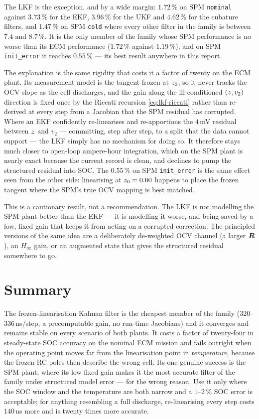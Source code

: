 The LKF is the exception, and by a wide margin: $1.72\,\%$ on SPM \texttt{nominal} against
$3.73\,\%$ for the EKF, $3.96\,\%$ for the UKF and $4.62\,\%$ for the cubature filters, and
$1.47\,\%$ on SPM \texttt{cold} where every other filter in the family is between $7.4$ and
$8.7\,\%$. It is the only member of the family whose SPM performance is no worse than its ECM
performance ($1.72\,\%$ against $1.19\,\%$), and on SPM \texttt{init\_error} it reaches
$0.55\,\%$ --- its best result anywhere in this report.

The explanation is the same rigidity that costs it a factor of twenty on the ECM plant. Its
measurement model is the tangent frozen at $z_0$, so it never tracks the OCV slope as the
cell discharges, and the gain along the ill-conditioned $(z, v_2)$ direction is fixed once
by the Riccati recursion \eqref{eq:lkf-riccati} rather than re-derived at every step from a
Jacobian that the SPM residual has corrupted. Where an EKF confidently re-linearises and
re-apportions the $4$\,mV residual between $z$ and $v_2$ --- committing, step after step, to
a split that the data cannot support --- the LKF simply has no mechanism for doing so. It
therefore stays much closer to open-loop ampere-hour integration, which on the SPM plant is
nearly exact because the current record is clean, and declines to pump the structured residual
into SOC. The $0.55\,\%$ on SPM \texttt{init\_error} is the same effect seen from the other
side: linearising at $z_0 = 0.60$ happens to place the frozen tangent where the SPM's true
OCV mapping is best matched.

This is a cautionary result, not a recommendation. The LKF is not modelling the SPM plant
better than the EKF --- it is modelling it worse, and being saved by a low, fixed gain that
keeps it from acting on a corrupted correction. The principled versions of the same idea are a
deliberately de-weighted OCV channel (a larger $\bm{R}$), an $H_\infty$ gain, or an augmented
state that gives the structured residual somewhere to go.

\section{Summary}
The frozen-linearisation Kalman filter is the cheapest member of the family
($320$--$336$\,ns/step, a precomputable gain, no run-time Jacobians) and it converges and
remains stable on every scenario of both plants. It costs a factor of twenty-four in
steady-state SOC accuracy on the nominal ECM mission and fails outright when the operating
point moves far from the linearisation point in \emph{temperature}, because the frozen RC poles
then describe the wrong cell. Its one genuine success is the SPM plant, where its low fixed
gain makes it the most accurate filter of the family under structured model error --- for the
wrong reason. Use it only where the SOC window and the temperature are both narrow and a
$1$--$2\,\%$ SOC error is acceptable; for anything resembling a full discharge, re-linearising
every step costs $140$\,ns more and is twenty times more accurate.
